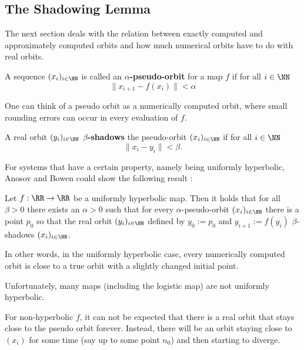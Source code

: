   \subsection{The Shadowing Lemma}
    The next section deals with the relation between exactly computed and approximately computed orbits and how much numerical orbits have to do with real orbits. 
    \begin{definition}\label{def:pseudoorbit}
      A sequence $(x_i)_{i \in \NN}$ is called an \textbf{$\alpha$-pseudo-orbit} for a map $f$ if for all $i \in \NN$
      $$ \| x_{i+1} - f(x_i) \| < \alpha $$  
    \end{definition}
    One can think of a pseudo orbit as a numerically computed orbit, where small rounding errors can occur in every evaluation of $f$.
    \begin{definition}\label{def:shadowing}
      A real orbit $(y_i)_{i \in \NN}$ \textbf{$\beta$-shadows} the pseudo-orbit $(x_i)_{i \in \NN}$ if for all $i \in \NN$
      $$\| x_i - y_i \| < \beta.$$  
    \end{definition}
    For systems that have a certain property, namely being uniformly
    hyperbolic, Anosov and Bowen could show the following result \cite{anosov1967} \cite{Bowen1975} \cite{Hasselblatt:2008}:
    \begin{theorem}
     Let $f: \RR \to \RR$ be a uniformly hyperbolic map.
     Then it holds that for all $\beta > 0$ there exists an $\alpha > 0$ such that for every $\alpha$-pseudo-orbit $(x_i)_{i \in \NN}$
     there is a point $p_0$ so that the real orbit $(y_i)_{i \in \NN}$ defined by $y_0 := p_0$ and $y_{i+1} := f(y_i)$ $\beta$-shadows $(x_i)_{i \in \NN}$.
    \end{theorem} 
    In other words, in the uniformly hyperbolic case, every numerically computed orbit is close to a true orbit with a slightly changed initial point.

    Unfortunately, many maps (including the logistic map) are not uniformly hyperbolic. 

    For non-hyperbolic $f$, it can not be expected that there is a real orbit that stays close to the pseudo orbit forever.
    Instead, there will be an orbit staying close to $(x_i)$ for some time (say up to some point $n_0$) and then starting to diverge. 

